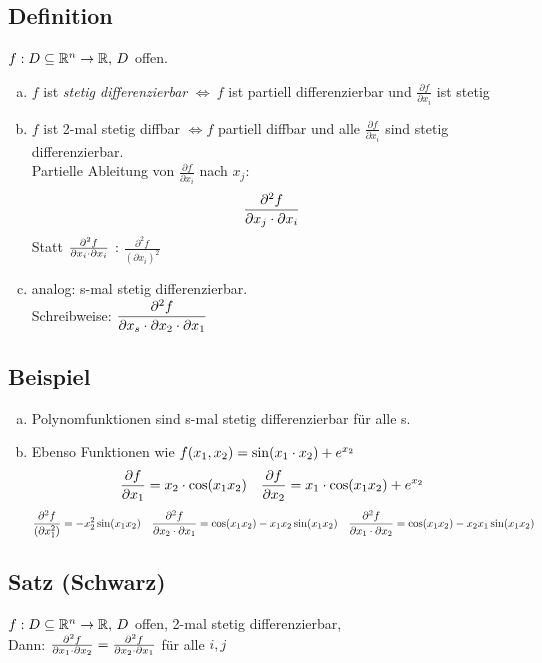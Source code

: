 \subsection{Definition}
$f: D \subseteq \mathbb{R}^n \to \mathbb{R},\,D$ offen.
\begin{enumerate}[a)]
\item $f$ ist \emph{stetig differenzierbar} $\Leftrightarrow\ f$ ist partiell differenzierbar und $\frac{\partial f}{\partial x_i}$ ist stetig
\item $f$ ist 2-mal stetig diffbar $\Leftrightarrow f$ partiell diffbar und alle $\frac{\partial f}{\partial x_i}$ sind stetig differenzierbar.\\
Partielle Ableitung von $\frac{\partial f}{\partial x_i}$ nach $x_j$:
\[\frac{\partial^2 f}{\partial x_j \cdot \partial x_i} \]
Statt $\frac{\partial^2 f}{\partial x_i \cdot \partial x_i}$ : $\frac{\partial^2 f}{(\partial x_i)^2}$
\item analog: s-mal stetig differenzierbar.\\
Schreibweise: $\dfrac{\partial^2 f}{\partial x_s  \cdot \partial x_2 \cdot \partial x_1}$
\end{enumerate}
\subsection{Beispiel}\label{sec:\thesubsection}
\begin{enumerate}[a)]
\item Polynomfunktionen sind s-mal stetig differenzierbar für alle s.
\item Ebenso Funktionen wie $f(x_1,x_2) = \sin(x_1\cdot x_2) + e^{x_2}$
\[ \frac{\partial f}{\partial x_1} = x_2 \cdot \cos(x_1x_2)  \quad \frac{\partial f}{\partial x_2} = x_1 \cdot \cos(x_1x_2) + e^{x_2}  \]
\[ \frac{\partial^2 f}{(\partial x_1^2)} = -x_2^2\sin(x_1x_2) \quad \frac{\partial^2 f}{\partial x_2 \cdot \partial x_1} =  \cos(x_1x_2) - x_1x_2 \sin(x_1x_2) \quad 
\frac{\partial^2 f}{\partial x_1 \cdot \partial x_2} =  \cos(x_1x_2) - x_2x_1 \sin(x_1x_2) \]
\end{enumerate}
\subsection{Satz (Schwarz)}\label{sec:\thesubsection}
$f : D \subseteq \mathbb{R}^n \to \mathbb{R},\, D$ offen, 2-mal stetig differenzierbar,\\
Dann: $\frac{\partial^2 f}{\partial x_1 \cdot \partial x_2} = \frac{\partial^2 f}{\partial x_2 \cdot \partial x_1}$ für alle $i,j$
